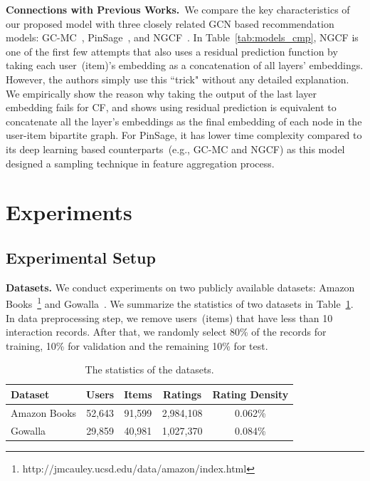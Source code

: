 \documentclass[letterpaper]{article} %
\begin{document}
\textbf{Connections with Previous Works.}~We compare the key characteristics of our proposed model with three closely related GCN based recommendation models: GC-MC~\cite{kdd2018GCMC}, PinSage~\cite{kdd2018Pinsage}, and NGCF~\cite{sigir2019ngcf}. In Table~\ref{tab:models_cmp}, NGCF is one of the first few attempts that also uses a residual prediction function  by taking each user~(item)'s embedding as a concatenation of all layers' embeddings. However, the authors simply use this ``trick" without any detailed explanation. We empirically show the reason why taking the output of the last layer embedding fails for CF, and shows using residual prediction is equivalent to concatenate all the layer's embeddings as the final embedding of each node in the user-item bipartite graph. For PinSage, it has lower time complexity compared to its deep learning based counterparts~(e.g., GC-MC and NGCF) as this model designed a sampling technique in feature aggregation process.

 

\section{Experiments}

\subsection{Experimental Setup}

\textbf{Datasets.}
We conduct experiments on two publicly available datasets: Amazon Books~\footnote{http://jmcauley.ucsd.edu/data/amazon/index.html} and Gowalla~\cite{liang2016modeling}. We summarize the statistics of two datasets in Table~\ref{tab:data_stats}. In data preprocessing step, we remove users~(items) that have less than 10 interaction records. After that, we randomly select 80\% of the records for training, 10\% for validation and the remaining 10\% for test. 

\begin{table}[htb] \centering
\vspace{-0.6cm}
\caption{\small{The statistics of the datasets.}}\label{tab:data_stats} 
\begin{scriptsize}
\begin{tabular}{|l|c|c|c|c|}
\hline
Dataset  & Users  & Items  &Ratings  & Rating Density \\ \hline 
Amazon Books &  52,643 & 91,599 & 2,984,108  & 0.062\%  \\  \hline 
Gowalla  &29,859 & 40,981 & 1,027,370& 0.084\%\\  \hline
\end{tabular}
\end{scriptsize}
\vspace{-0.3cm}
\end{table}
\end{document}
